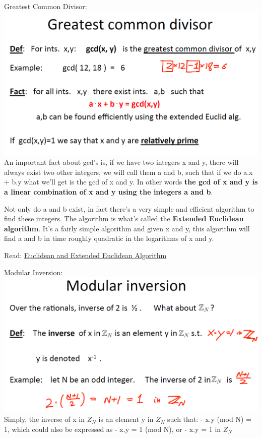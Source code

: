 \documentclass[11pt]{article}
\makeatletter
\def\maxwidth{\ifdim\Gin@nat@width>\linewidth\linewidth
    \else\Gin@nat@width\fi}
\let\Oldincludegraphics\includegraphics
\renewcommand{\includegraphics}[1]{\Oldincludegraphics[width=.8\maxwidth]{#1}}
\makeatother
\begin{document}
Greatest Common Divisor: \includegraphics{./Images/NT-GCD.png} An
important fact about gcd's is, if we have two integers x and y, there
will always exist two other integers, we will call them a and b, such
that if we do a.x + b.y what we'll get is the gcd of x and y. In other
words \textbf{the gcd of x and y is a linear combination of x and y
using the integers a and b}.

Not only do a and b exist, in fact there's a very simple and efficient
algorithm to find these integers. The algorithm is what's called the
\textbf{Extended Euclidean algorithm}. It's a fairly simple algorithm
and given x and y, this algorithm will find a and b in time roughly
quadratic in the logarithms of x and y.

Read:
\href{https://brilliant.org/wiki/extended-euclidean-algorithm/}{Euclidean
and Extended Euclidean Algorithm}

Modular Inversion: \includegraphics{./Images/NT-ModInver.png} Simply,
the inverse of x in \(Z_{N}\) is an element y in \(Z_{N}\) such that: -
x.y (mod N) = 1, which could also be expressed as - x.y = 1 (mod N), or
- x.y = 1 in \(Z_{N}\)
\end{document}
